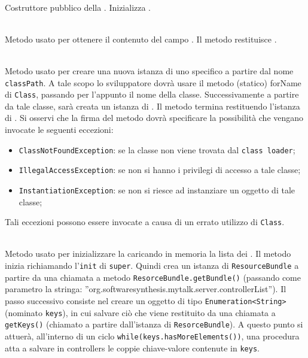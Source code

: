 \begin{description}
	\item{}\\
	Costruttore pubblico della . Inizializza .
	
	\item{}\\
	Metodo usato per ottenere il contenuto del campo . Il metodo restituisce .
	
	\item{}\\
	Metodo usato per creare una nuova istanza di uno specifico  a partire dal nome \texttt{classPath}. A tale scopo lo sviluppatore dovrà usare il metodo (statico) forName di \texttt{Class}, passando per l'appunto il nome della classe. Successivamente a partire da tale classe, sarà creata un istanza di . Il metodo termina restituendo l'istanza di . Si osservi che la firma del metodo dovrà specificare la possibilità che vengano invocate le seguenti eccezioni:
	\begin{itemize}
		\item \texttt{ClassNotFoundException}: se la classe non viene trovata dal \texttt{class loader};
		\item \texttt{IllegalAccessException}: se non si hanno i privilegi di accesso a tale classe;
		\item \texttt{InstantiationException}: se non si riesce ad instanziare un oggetto di tale classe;
	\end{itemize}
	
	Tali eccezioni possono essere invocate a causa di un errato utilizzo di \texttt{Class}.
	
	\item{}\\
	Metodo usato per inizializzare la  caricando in memoria la lista dei . Il metodo inizia richiamando l'\texttt{init} di \texttt{super}. Quindi crea un istanza di \texttt{ResourceBundle} a partire da una chiamata a metodo \texttt{ResorceBundle.getBundle()} (passando come parametro la stringa: ''org.softwaresynthesis.mytalk.server.controllerList''). Il passo successivo consiste nel creare un oggetto di tipo \texttt{Enumeration<String>} (nominato \texttt{keys}), in cui salvare ciò che viene restituito da una chiamata a \texttt{getKeys()} (chiamato a partire dall'istanza di \texttt{ResorceBundle}). A questo punto si attuerà, all'interno di un ciclo \verb|while(keys.hasMoreElements())|, una procedura atta a salvare in controllers le coppie chiave-valore contenute in \texttt{keys}.
	

\end{description}
